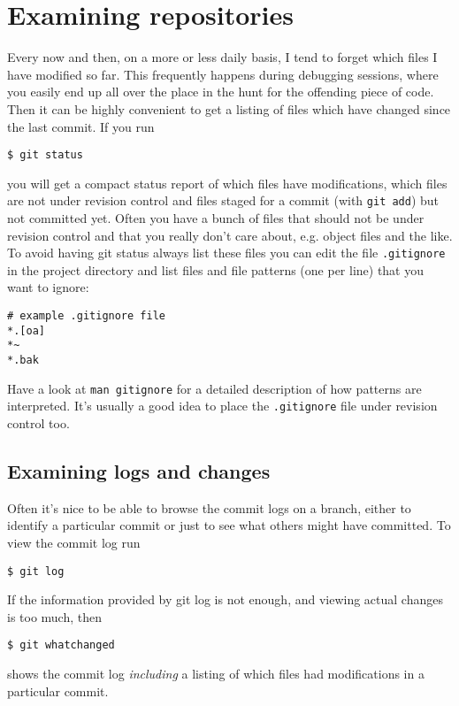 \documentclass[a4paper,10pt]{article}
\begin{document}
\section{Examining repositories}
\label{sec:examine}
Every now and then, on a more or less daily basis, I tend to forget which
files I have modified so far. This frequently happens during debugging
sessions, where you easily end up all over the place in the hunt for the
offending piece of code. Then it can be highly convenient to get a listing 
of files which have changed since the last commit. If you run
\begin{verbatim}
$ git status
\end{verbatim}
you will get a compact status report of which files have modifications, which
files are not under revision control and files staged for a commit (with
\texttt{git add}) but not committed yet. Often you have a bunch of files that
should not be under revision control and that you really don't care about,
e.g.  object files and the like. To avoid having git status always list these
files you can edit the file \texttt{.gitignore} in the project directory and
list files and file patterns (one per line) that you want to ignore:
\begin{verbatim}
# example .gitignore file
*.[oa]
*~
*.bak

\end{verbatim}
Have a look at \texttt{man gitignore} for a detailed description of how 
patterns are interpreted.
It's usually a good idea to place the \texttt{.gitignore} file under revision 
control too. 

\subsection{Examining logs and changes}
Often it's nice to be able to browse the commit logs on a branch, either
to identify a particular commit or just to see what others might have
committed. To view the commit log run
\begin{verbatim}
$ git log
\end{verbatim}
If the information provided by git log is not enough, and viewing actual
changes is too much, then
\begin{verbatim}
$ git whatchanged
\end{verbatim}
shows the commit log \emph{including} a listing of which files had
modifications in a particular commit. 
\end{document}
